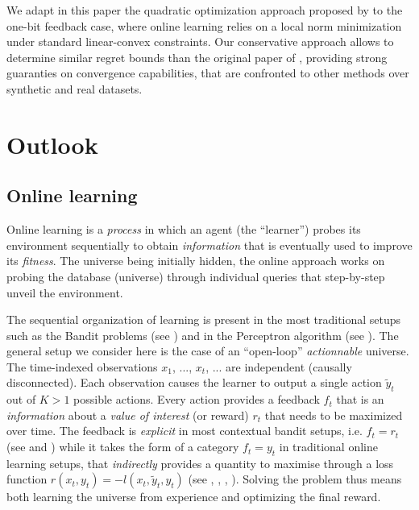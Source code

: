 \documentclass[preprint,12pt,authoryear]{elsarticle}
\begin{document}
We adapt in this paper the quadratic optimization approach proposed by \cite{crammer2006online} to the one-bit feedback case, where online learning relies on a local norm minimization under standard linear-convex constraints. Our conservative approach allows to determine similar regret bounds than the original paper of \cite{crammer2006online}, providing strong guaranties on  convergence capabilities, that are confronted to other methods over synthetic and real datasets.  

\section{Outlook}

\subsection{Online learning} Online learning is a \textit{process} in which an agent (the ``learner'') probes its environment sequentially to obtain \textit{information} that is eventually used to improve its \textit{fitness}.
The universe being initially hidden, the online approach works on probing the database (universe) through individual queries that step-by-step unveil the environment. 

The sequential organization of learning is present in the most traditional setups such as the Bandit problems (see \cite{robbins1952bandit}) and in the Perceptron algorithm (see \cite{rosenblatt1958perceptron}). The general setup we consider here is the case of an ``open-loop'' \textit{actionnable} universe. The time-indexed observations $x_1$, ..., $x_t$, ... are independent (causally disconnected). Each observation causes the learner to output a single action $\tilde{y}_t$ out of $K > 1$ possible actions. Every action provides a feedback $f_t$ that is an \textit{information} about a \textit{value of interest} (or reward) $r_t$ that needs to be maximized over time. The feedback is \textit{explicit} in most contextual bandit setups, i.e. $f_t=r_t$ (see \cite{lai1985asymptotically} and \cite{auer2002finite}) while it takes the form of a category $f_t=y_t$ in traditional online learning setups, that \textit{indirectly} provides a quantity to maximise through a loss function $r(x_t, y_t) = -l(x_t,\tilde{y}_t, y_t)$ (see  \cite{duda1973pattern}, \cite{freund1999large}, \cite{kivinen2004online}, \cite{crammer2006online}). Solving the problem thus means both  learning the universe from experience and optimizing the final reward. 
\end{document}
